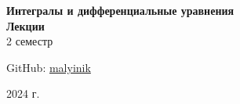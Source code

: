 



\begin{titlepage}
    \vspace*{0pt}
    \vfill
    \centering
    \Huge\textbf{Интегралы и дифференциальные уравнения} \\[7pt]
    \Large\textbf{Лекции} \\
    \large 2 семестр \\ 
    \vfill
    \begin{flushright}
        \normalsize GitHub: \href{https://github.com/malyinik}{malyinik} \\
    \end{flushright}
    \normalsize 2024 г.
\end{titlepage}
\newpage

\tableofcontents
\newpage

\newpage
\zerocounter

\zerocounter
\newpage

\zerocounter
\newpage

\newpage
\zerocounter


